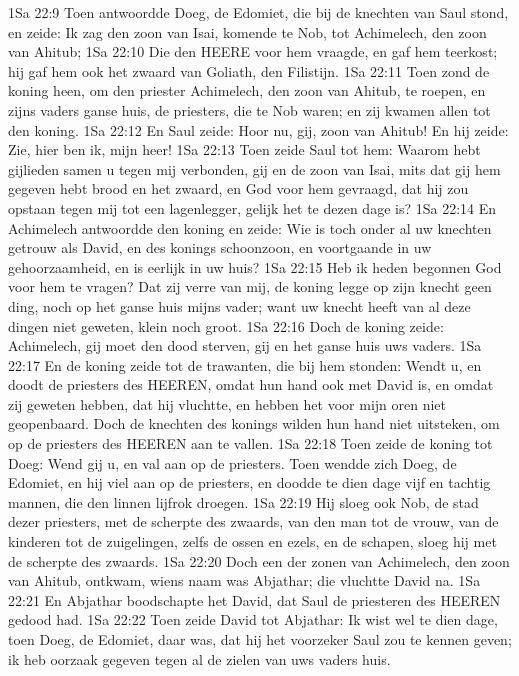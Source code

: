 1Sa 22:9  Toen antwoordde Doeg, de Edomiet, die bij de knechten van Saul stond, en zeide: Ik zag den zoon van Isai, komende te Nob, tot Achimelech, den zoon van Ahitub;
1Sa 22:10  Die den HEERE voor hem vraagde, en gaf hem teerkost; hij gaf hem ook het zwaard van Goliath, den Filistijn.
1Sa 22:11  Toen zond de koning heen, om den priester Achimelech, den zoon van Ahitub, te roepen, en zijns vaders ganse huis, de priesters, die te Nob waren; en zij kwamen allen tot den koning.
1Sa 22:12  En Saul zeide: Hoor nu, gij, zoon van Ahitub! En hij zeide: Zie, hier ben ik, mijn heer!
1Sa 22:13  Toen zeide Saul tot hem: Waarom hebt gijlieden samen u tegen mij verbonden, gij en de zoon van Isai, mits dat gij hem gegeven hebt brood en het zwaard, en God voor hem gevraagd, dat hij zou opstaan tegen mij tot een lagenlegger, gelijk het te dezen dage is?
1Sa 22:14  En Achimelech antwoordde den koning en zeide: Wie is toch onder al uw knechten getrouw als David, en des konings schoonzoon, en voortgaande in uw gehoorzaamheid, en is eerlijk in uw huis?
1Sa 22:15  Heb ik heden begonnen God voor hem te vragen? Dat zij verre van mij, de koning legge op zijn knecht geen ding, noch op het ganse huis mijns vader; want uw knecht heeft van al deze dingen niet geweten, klein noch groot.
1Sa 22:16  Doch de koning zeide: Achimelech, gij moet den dood sterven, gij en het ganse huis uws vaders.
1Sa 22:17  En de koning zeide tot de trawanten, die bij hem stonden: Wendt u, en doodt de priesters des HEEREN, omdat hun hand ook met David is, en omdat zij geweten hebben, dat hij vluchtte, en hebben het voor mijn oren niet geopenbaard. Doch de knechten des konings wilden hun hand niet uitsteken, om op de priesters des HEEREN aan te vallen.
1Sa 22:18  Toen zeide de koning tot Doeg: Wend gij u, en val aan op de priesters. Toen wendde zich Doeg, de Edomiet, en hij viel aan op de priesters, en doodde te dien dage vijf en tachtig mannen, die den linnen lijfrok droegen.
1Sa 22:19  Hij sloeg ook Nob, de stad dezer priesters, met de scherpte des zwaards, van den man tot de vrouw, van de kinderen tot de zuigelingen, zelfs de ossen en ezels, en de schapen, sloeg hij met de scherpte des zwaards.
1Sa 22:20  Doch een der zonen van Achimelech, den zoon van Ahitub, ontkwam, wiens naam was Abjathar; die vluchtte David na.
1Sa 22:21  En Abjathar boodschapte het David, dat Saul de priesteren des HEEREN gedood had.
1Sa 22:22  Toen zeide David tot Abjathar: Ik wist wel te dien dage, toen Doeg, de Edomiet, daar was, dat hij het voorzeker Saul zou te kennen geven; ik heb oorzaak gegeven tegen al de zielen van uws vaders huis.

